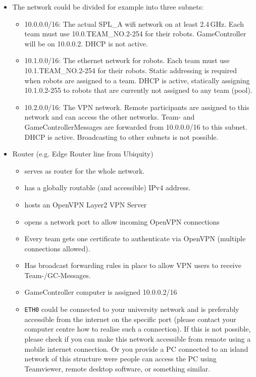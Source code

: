\begin{itemize}
    \item  The network could be divided for example into three subnets:
    \begin{itemize}
        \item 10.0.0.0/16: The actual SPL\_A wifi network on at least 2.4\,GHz. Each team must use 10.0.TEAM\_NO.2-254 for their robots. GameController will be on 10.0.0.2. DHCP is not active.
        \item 10.1.0.0/16: The ethernet network for robots. Each team must use 10.1.TEAM\_NO.2-254 for their robots. Static addressing is required when robots are assigned to a team. DHCP is active, statically assigning 10.1.0.2-255 to robots that are currently not assigned to any team (pool).
        \item 10.2.0.0/16: The VPN network. Remote participants are assigned to this network and can access the other networks. Team- and GameControllerMessages are forwarded from 10.0.0.0/16 to this subnet. DHCP is active. Broadcasting to other subnets is not possible.
    \end{itemize}
    \item Router (e.g. Edge Router line from Ubiquity)
    \begin{itemize}
        \item serves as router for the whole network.
        \item has a globally routable (and accessible) IPv4 address.
        \item hosts an OpenVPN Layer2 VPN Server
        \item opens a network port to allow incoming OpenVPN connections
        \item Every team gets one certificate to authenticate via OpenVPN (multiple connections allowed).
        \item Has broadcast forwarding rules in place to allow VPN users to receive Team-/GC-Messages.
        \item GameController computer is assigned 10.0.0.2/16
        \item \texttt{ETH0} could be connected to your university network and is preferably accessible from the internet on the specific port (please contact your computer centre how to realise such a connection). If this is not possible, please check if you can make this network accessible from remote using a mobile internet connection. Or you provide a PC connected to an island network of this structure were people can access the PC using Teamviewer, remote desktop software, or something similar. 
    \end{itemize}
\end{itemize}

